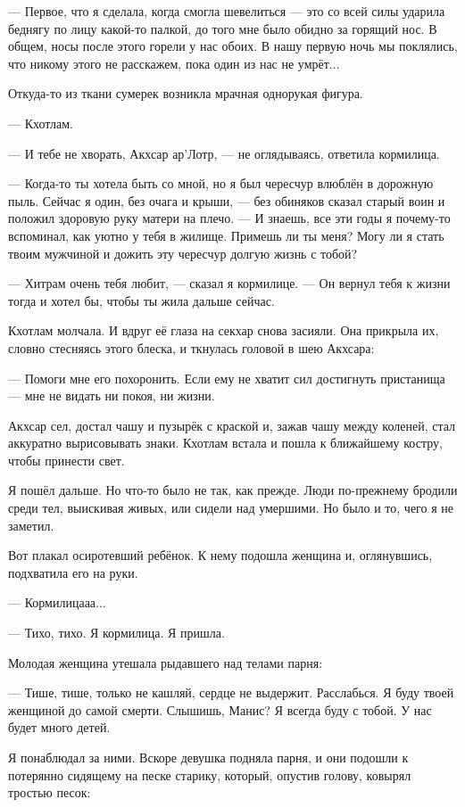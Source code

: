 --- Первое, что я сделала, когда смогла шевелиться --- это со всей силы ударила беднягу по лицу какой-то палкой, до того мне было обидно за горящий нос.
В общем, носы после этого горели у нас обоих.
В нашу первую ночь мы поклялись, что никому этого не расскажем, пока один из нас не умрёт...

Откуда-то из ткани сумерек возникла мрачная однорукая фигура.

--- Кхотлам.

--- И тебе не хворать, Акхсар ар’Лотр, --- не оглядываясь, ответила кормилица.

--- Когда-то ты хотела быть со мной, но я был чересчур влюблён в дорожную пыль.
Сейчас я один, без очага и крыши, --- без обиняков сказал старый воин и положил здоровую руку матери на плечо.
--- И знаешь, все эти годы я почему-то вспоминал, как уютно у тебя в жилище.
Примешь ли ты меня?
Могу ли я стать твоим мужчиной и дожить эту чересчур долгую жизнь с тобой?

--- Хитрам очень тебя любит, --- сказал я кормилице.
--- Он вернул тебя к жизни тогда и хотел бы, чтобы ты жила дальше сейчас.

Кхотлам молчала.
И вдруг её глаза на секхар снова засияли.
Она прикрыла их, словно стесняясь этого блеска, и ткнулась головой в шею Акхсара:

--- Помоги мне его похоронить.
Если ему не хватит сил достигнуть пристанища --- мне не видать ни покоя, ни жизни.

Акхсар сел, достал чашу и пузырёк с краской и, зажав чашу между коленей, стал аккуратно вырисовывать знаки.
Кхотлам встала и пошла к ближайшему костру, чтобы принести свет.

Я пошёл дальше.
Но что-то было не так, как прежде.
Люди по-прежнему бродили среди тел, выискивая живых, или сидели над умершими.
Но было и то, чего я не заметил.

Вот плакал осиротевший ребёнок.
К нему подошла женщина и, оглянувшись, подхватила его на руки.

--- Кормилицааа...

--- Тихо, тихо.
Я кормилица.
Я пришла.

Молодая женщина утешала рыдавшего над телами парня:

--- Тише, тише, только не кашляй, сердце не выдержит.
Расслабься.
Я буду твоей женщиной до самой смерти.
Слышишь, Манис?
Я всегда буду с тобой.
У нас будет много детей.

Я понаблюдал за ними.
Вскоре девушка подняла парня, и они подошли к потерянно сидящему на песке старику, который, опустив голову, ковырял тростью песок:

